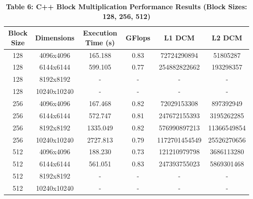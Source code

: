 \documentclass{article}
\begin{document}
\begin{table}[H]
\centering
\caption*{\textbf{Table 6: C++ Block Multiplication Performance Results (Block Sizes: 128, 256, 512)}}
\begin{tabular}{||c | c | c | c | c | c||} 
 \hline
 \textbf{Block Size} & \textbf{Dimensions} & \textbf{Execution Time (s)} & \textbf{GFlops} & \textbf{L1 DCM} & \textbf{L2 DCM} \\  
 \hline \hline
 128  & 4096x4096  & 165.188  & 0.83  & 72724290894   & 51805287    \\  
 \hline
 128  & 6144x6144  & 599.105  & 0.77  & 254882822662  & 193298357   \\  
 \hline
 128  & 8192x8192  & -        & -     & -             & -           \\  
 \hline
 128  & 10240x10240 & -       & -     & -             & -           \\  
 \hline \hline
 256  & 4096x4096  & 167.468  & 0.82  & 72029153308   & 897392949   \\  
 \hline
 256  & 6144x6144  & 572.747  & 0.81  & 247672155393  & 3195262285  \\  
 \hline
 256  & 8192x8192  & 1335.049 & 0.82  & 576990897213  & 11366549854 \\  
 \hline
 256  & 10240x10240 & 2727.813 & 0.79  & 1172701454549 & 25526270656 \\  
 \hline \hline
 512  & 4096x4096  & 188.230  & 0.73  & 121210979798  & 3686113280  \\  
 \hline
 512  & 6144x6144  & 561.051  & 0.83  & 247393755023  & 5869301468  \\  
 \hline
 512  & 8192x8192  & -        & -     & -             & -           \\  
 \hline
 512  & 10240x10240 & -       & -     & -             & -           \\  
 \hline
\end{tabular}
\end{table}
\end{document}
